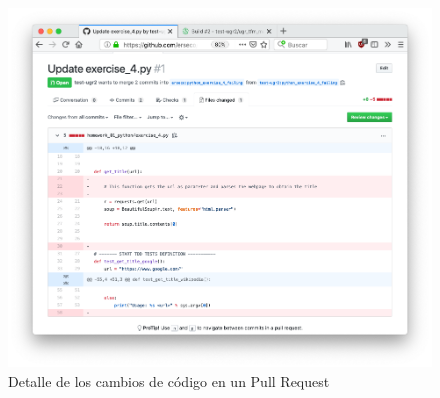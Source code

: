 \begin{figure}[h!]
\centering
\includegraphics[width=1.0\textwidth]{../images/github_pr_diff}
\caption{Detalle de los cambios de código en un Pull Request}
\label{fig:github_pr_diff}
\end{figure}




